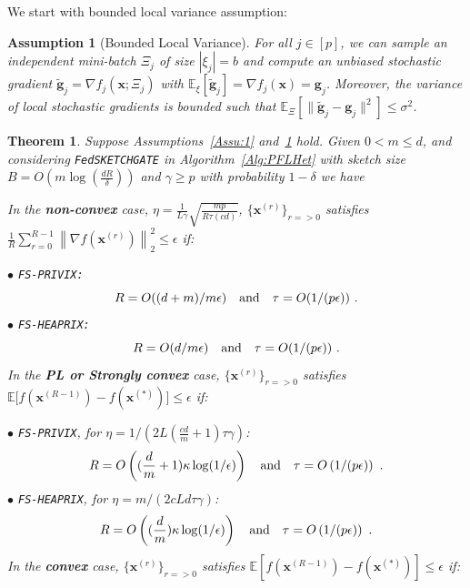 \documentclass{article}
\newtheorem{theorem}{Theorem}
\newtheorem{assumption}{Assumption}
\begin{document}
We start with bounded local variance assumption:
\begin{assumption}[Bounded Local Variance]\label{Assu:2}
For all $j\in [p]$, we can sample an independent mini-batch $\Xi_j$ of size $|{\xi}_j| = b$ and compute an unbiased stochastic gradient $\tilde{\mathbf{g}}_j = \nabla f_j(\boldsymbol{x}; \Xi_j)$ with $\mathbb{E}_{\xi}[\tilde{\mathbf{g}}_j] = \nabla f_{j}(\boldsymbol{x})={\mathbf{g}}_j$. 
Moreover, the variance of local stochastic gradients is bounded such that $
\mathbb{E}_{\Xi}\left[\|\tilde{\mathbf{g}}_j-{\mathbf{g}}_j\|^2\right]\leq \sigma^2$.
\end{assumption}
\begin{theorem}\label{thm:hetreg_case}
Suppose Assumptions~\ref{Assu:1} and~\ref{Assu:2} hold. Given $0<m\leq d$, and considering \texttt{FedSKETCHGATE} in Algorithm~\ref{Alg:PFLHet} with sketch size $B=O\left(m\log\left(\frac{d R}{\delta}\right)\right)$ and $\gamma\geq p$ with probability $1-\delta$ we have  



In the \textbf{non-convex} case, $\eta=\frac{1}{L\gamma}\sqrt{\frac{mp}{R\tau\left(cd\right)}}$, $\{ {\boldsymbol{x}}^{(r)}\}_{r=>0}$ satisfies  $\frac{1}{R}\sum_{r=0}^{R-1}\left\|\nabla f({\boldsymbol{x}}^{(r)})\right\|_2^2\leq {\epsilon}$ if: 
 
\noindent $\bullet$ \texttt{FS-PRIVIX:}    
\begin{equation}\notag
R=O((d+m)/m\epsilon) \quad \textrm{and} \quad \tau=O(1/(p\epsilon))\ .
 \end{equation}
\noindent $\bullet$ \texttt{FS-HEAPRIX:} 
\begin{equation}\notag
R=O(d/m\epsilon) \quad \textrm{and} \quad \tau=O(1/(p\epsilon))\ .
 \end{equation}
In the \textbf{PL or Strongly convex} case, $\{ {\boldsymbol{x}}^{(r)}\}_{r=>0}$ satisfies $\mathbb{E}\Big[f({\boldsymbol{x}}^{(R-1)})-f({\boldsymbol{x}}^{(*)})\Big]\leq \epsilon$ if: 

\noindent $\bullet$ \texttt{FS-PRIVIX}, for $\eta=1/(2L(\frac{cd}{m}+1)\tau\gamma)$:    
\begin{equation}\notag
R=O\left((\frac{d}{m}+1)\kappa \log(1/\epsilon)\right) \quad \textrm{and} \quad \tau=O\left(1/(p\epsilon)\right)\ .
 \end{equation}
\noindent $\bullet$ \texttt{FS-HEAPRIX}, for $\eta=m/(2cLd\tau\gamma)$:
\begin{equation}\notag
R=O\left((\frac{d}{m})\kappa \log(1/\epsilon)\right) \quad \textrm{and} \quad \tau=O\left(1/(p\epsilon)\right)\ .
 \end{equation}
 In the \textbf{convex} case, $\{ {\boldsymbol{x}}^{(r)}\}_{r=>0}$ satisfies $ \mathbb{E}[f({\boldsymbol{x}}^{(R-1)})-f({\boldsymbol{x}}^{(*)})]\leq \epsilon$ if: 
 

\end{theorem}
\end{document}
